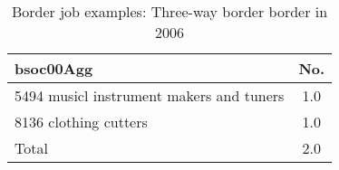 \begin{table}[h!]
	\centering
	\caption{Border job examples: Three-way border border in 2006}
	\label{tab:3572123mult}
	\begin{tabular}{lc}
	\toprule
bsoc00Agg&No. \\
\hline
5494 musicl instrument makers and tuners&1.0 \\
8136 clothing cutters&1.0 \\
Total&2.0 \\
\bottomrule
\bottomrule
\end{tabular}
\end{table}
